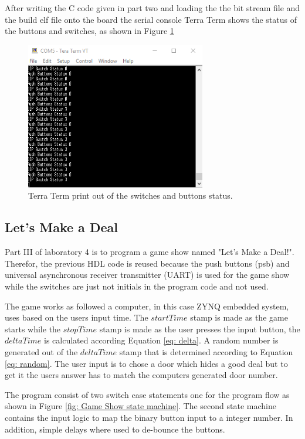 After writing the C code given in part two and loading the the bit stream file and the build elf file onto the board the serial console Terra Term shows the status of the buttons and switches, as shown in Figure \ref{fig: Vivado_lab4_TT_PartII}
\begin{figure}[H]
	\centering
	\includegraphics[width=0.7\textwidth]{01_images/Vivado_lab4_TT_PartII.PNG}
	\caption{Terra Term print out of the switches and buttons status.}
	\label{fig: Vivado_lab4_TT_PartII}
\end{figure}

\subsection{Let's Make a Deal}\label{subsec: Lets Make a Deal}
Part III of laboratory 4 is to program a game show named "Let's Make a Deal!". 
Therefor, the previous HDL code is reused because the push buttons (psb) and universal asynchronous receiver transmitter (UART) is used for the game show while the switches are just not initials in the program code and not used. 

The game works as followed a computer, in this case ZYNQ embedded system, uses based on the users input time. The $startTime$ stamp is made as the game starts while the $stopTime$ stamp is made as the user presses the input button, the $deltaTime$ is calculated according Equation \ref{eq: delta}. A random number is generated out of the $deltaTime$ stamp that is determined according to Equation \ref{eq: random}. The user input is to chose a door which hides a good deal but to get it the users answer has to match the computers generated door number.

The program consist of two switch case statements one for the program flow as shown in Figure \ref{fig: Game Show state machine}. The second state machine contains the input logic to map the binary button input to a integer number. In addition, simple delays where used to de-bounce the buttons.  

